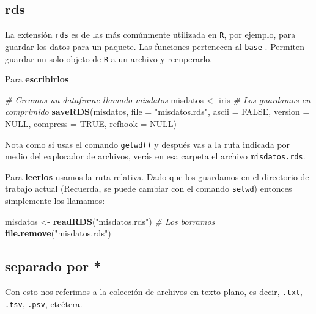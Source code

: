 \documentclass[]{article}
\newenvironment{Shaded}{\begin{snugshade}}{\end{snugshade}}
\newcommand{\KeywordTok}[1]{\textcolor[rgb]{0.13,0.29,0.53}{\textbf{#1}}}
\newcommand{\DataTypeTok}[1]{\textcolor[rgb]{0.13,0.29,0.53}{#1}}
\newcommand{\StringTok}[1]{\textcolor[rgb]{0.31,0.60,0.02}{#1}}
\newcommand{\CommentTok}[1]{\textcolor[rgb]{0.56,0.35,0.01}{\textit{#1}}}
\newcommand{\OtherTok}[1]{\textcolor[rgb]{0.56,0.35,0.01}{#1}}
\newcommand{\NormalTok}[1]{#1}
\begin{document}
\subsection{rds}\label{rds}

La extensión \texttt{rds} es de las más comúnmente utilizada en
\texttt{R}, por ejemplo, para guardar los datos para un paquete. Las
funciones pertenecen al \texttt{base} \parencite{rbase}. Permiten
guardar un solo objeto de \texttt{R} a un archivo y recuperarlo.

Para \textbf{escribirlos}

\begin{Shaded}
\begin{Highlighting}[]
\CommentTok{# Creamos un dataframe llamado misdatos}
\NormalTok{misdatos <-}\StringTok{ }\NormalTok{iris}
\CommentTok{# Los guardamos en comprimido}
\KeywordTok{saveRDS}\NormalTok{(misdatos, }\DataTypeTok{file =} \StringTok{"misdatos.rds"}\NormalTok{, }\DataTypeTok{ascii =} \OtherTok{FALSE}\NormalTok{, }\DataTypeTok{version =} \OtherTok{NULL}\NormalTok{,}
        \DataTypeTok{compress =} \OtherTok{TRUE}\NormalTok{, }\DataTypeTok{refhook =} \OtherTok{NULL}\NormalTok{)}
\end{Highlighting}
\end{Shaded}

Nota como si usas el comando \texttt{getwd()} y después vas a la ruta
indicada por medio del explorador de archivos, verás en esa carpeta el
archivo \texttt{misdatos.rds}.

Para \textbf{leerlos} usamos la ruta relativa. Dado que los guardamos en
el directorio de trabajo actual (Recuerda, se puede cambiar con el
comando \texttt{setwd}) entonces simplemente los llamamos:

\begin{Shaded}
\begin{Highlighting}[]
\NormalTok{misdatos <-}\StringTok{ }\KeywordTok{readRDS}\NormalTok{(}\StringTok{"misdatos.rds"}\NormalTok{)}
\CommentTok{# Los borramos}
\KeywordTok{file.remove}\NormalTok{(}\StringTok{"misdatos.rds"}\NormalTok{)}
\end{Highlighting}
\end{Shaded}

\subsection{separado por *}\label{separado-por}

Con esto nos referimos a la colección de archivos en texto plano, es
decir, \texttt{.txt}, \texttt{.tsv}, \texttt{.psv}, etcétera.
\end{document}
